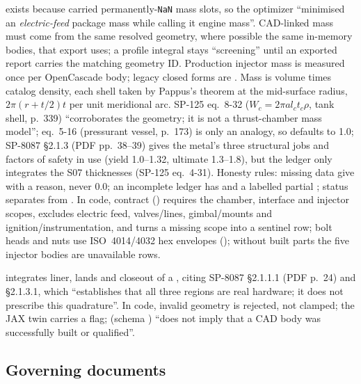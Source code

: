 \textbf{} exists because  carried permanently-\texttt{NaN} mass slots, so the optimizer ``minimised an \emph{electric-feed} package mass while calling it engine mass''. CAD-linked mass must come from the same resolved geometry, where possible the same in-memory bodies, that export uses; a profile integral stays ``screening'' until an exported report carries the matching geometry ID. Production injector mass is measured once per OpenCascade body; legacy closed forms are . Mass is volume times catalog density, each shell taken by Pappus's theorem at the mid-surface radius, $2\pi(r+t/2)t$ per unit meridional arc. SP-125 eq.~8-32 ($W_c=2\pi a l_c t_c\rho$, tank shell, p.~339) ``corroborates the geometry; it is not a thrust-chamber mass model''; eq.~5-16 (pressurant vessel, p.~173) is only an analogy, so  defaults to 1.0; SP-8087 \S2.1.3 (PDF pp.~38--39) gives the metal's three structural jobs and factors of safety in use (yield 1.0--1.32, ultimate 1.3--1.8), but the ledger only integrates the S07 thicknesses (SP-125 eq.~4-31). Honesty rules: missing data give  with a reason, never 0.0; an incomplete ledger has  and a labelled partial ; status separates  from . In code, contract  () requires the chamber, interface and injector scopes, excludes electric feed, valves/lines, gimbal/mounts and ignition/instrumentation, and turns a missing scope into a sentinel row; bolt heads and nuts use ISO~4014/4032 hex envelopes (); without built parts the five injector bodies are unavailable rows.

\textbf{} integrates liner, lands and closeout of a , citing SP-8087 \S2.1.1.1 (PDF p.~24) and \S2.1.3.1, which ``establishes that all three regions are real hardware; it does not prescribe this quadrature''. In code, invalid geometry is rejected, not clamped; the JAX twin carries a  flag;  (schema ) ``does not imply that a CAD body was successfully built or qualified''.

\subsection{Governing documents}

